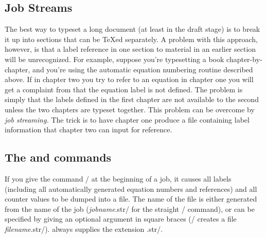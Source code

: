 \begin{(|it
name|/)}
\begin{(|it
name|/)}
\begin{narrow}[.80in]
\begin{narrow}
\begin{eqnseries}

{\bigfonts\bfs\section{Job Streams}}

The best way to typeset a long document (at least in the draft stage) is to
break it up into sections that can be \TeX ed separately.  A problem with this
approach, however, is that a label reference in one section to material in an
earlier section will be unrecognized.  For example, suppose you're typesetting
a book chapter-by-chapter, and you're using the automatic equation numbering
routine described above.  If in chapter two you try to refer to an equation in
chapter one you will get a complaint from \jyTeX{} that the equation label is
not defined. The problem is simply that the labels defined in the first chapter
are not available to the second unless the two chapters are typeset together.
This problem can be overcome by {\it job streaming.}  The trick is to have
chapter one produce a file containing label information that chapter two can
input for reference.

{\sl\subsection{The\/ {\tt\string\streamto} and\/
     {\tt\string\streamfrom} commands}}

If you give the command \tts\streamto/ at the beginning of a job, it causes all
labels (including all automatically generated equation numbers and references)
and all \jyTeX{} counter values to be dumped into a file.  The name of the file
is either generated from the name of the job ({\it jobname\/}\tts.str/ for the
straight \tts\streamto/ command), or can be specified by giving an optional
argument in square braces (\tts\streamto[(|it filename|/)]/ creates a file {\it
filename\/}\tts.str/). \jyTeX{} always supplies the extension \tts.str/.


\end{eqnseries}
\end{narrow}
\end{narrow}
\end{(|it
name|/)}
\end{(|it
name|/)}
